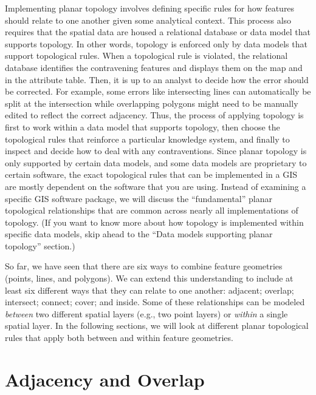 \documentclass[
]{book}
\begin{document}
Implementing planar topology involves defining specific rules for how features should relate to one another given some analytical context. This process also requires that the spatial data are housed a relational database or data model that supports topology. In other words, topology is enforced only by data models that support topological rules. When a topological rule is violated, the relational database identifies the contravening features and displays them on the map and in the attribute table. Then, it is up to an analyst to decide how the error should be corrected. For example, some errors like intersecting lines can automatically be split at the intersection while overlapping polygons might need to be manually edited to reflect the correct adjacency. Thus, the process of applying topology is first to work within a data model that supports topology, then choose the topological rules that reinforce a particular knowledge system, and finally to inspect and decide how to deal with any contraventions. Since planar topology is only supported by certain data models, and some data models are proprietary to certain software, the exact topological rules that can be implemented in a GIS are mostly dependent on the software that you are using. Instead of examining a specific GIS software package, we will discuss the ``fundamental'' planar topological relationships that are common across nearly all implementations of topology. (If you want to know more about how topology is implemented within specific data models, skip ahead to the ``Data models supporting planar topology'' section.)

So far, we have seen that there are six ways to combine feature geometries (points, lines, and polygons). We can extend this understanding to include at least six different ways that they can relate to one another: adjacent; overlap; intersect; connect; cover; and inside. Some of these relationships can be modeled \emph{between} two different spatial layers (e.g., two point layers) or \emph{within} a single spatial layer. In the following sections, we will look at different planar topological rules that apply both between and within feature geometries.

\section{Adjacency and Overlap}\label{adjacency-and-overlap}
\end{document}
